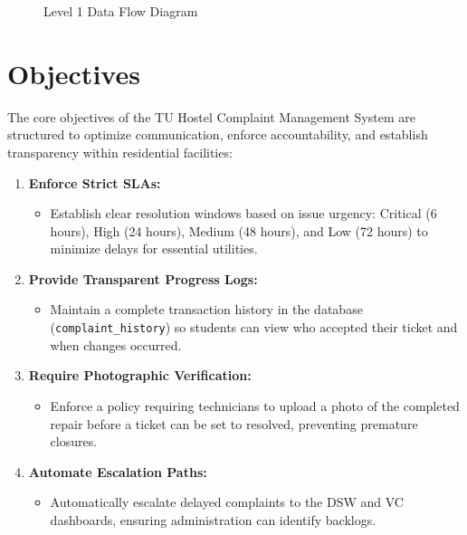 \documentclass[12pt,a4paper]{article}
\begin{document}
\begin{figure}[h!]
{\begin{minipage}[c][13.5cm][c]{0.95\textwidth}
    \end{minipage}
}
\caption{Level 1 Data Flow Diagram}
\end{figure}

\newpage
\section{Objectives}
The core objectives of the TU Hostel Complaint Management System are structured to optimize communication, enforce accountability, and establish transparency within residential facilities:
\begin{enumerate}
    \item \textbf{Enforce Strict SLAs:}
    \begin{itemize}
        \item Establish clear resolution windows based on issue urgency: Critical (6 hours), High (24 hours), Medium (48 hours), and Low (72 hours) to minimize delays for essential utilities.
    \end{itemize}
    \item \textbf{Provide Transparent Progress Logs:}
    \begin{itemize}
        \item Maintain a complete transaction history in the database (\texttt{complaint\_history}) so students can view who accepted their ticket and when changes occurred.
    \end{itemize}
    \item \textbf{Require Photographic Verification:}
    \begin{itemize}
        \item Enforce a policy requiring technicians to upload a photo of the completed repair before a ticket can be set to resolved, preventing premature closures.
    \end{itemize}
    \item \textbf{Automate Escalation Paths:}
    \begin{itemize}
        \item Automatically escalate delayed complaints to the DSW and VC dashboards, ensuring administration can identify backlogs.
    \end{itemize}
\end{enumerate}
\end{document}
